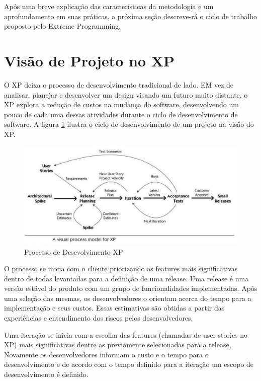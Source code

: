 Após uma breve explicação das características da metodologia e um aprofundamento em suas práticas, a próxima seção descreve-rá o ciclo de trabalho proposto pelo Extreme Programming.

\section{Visão de Projeto no XP}

O XP deixa o processo de desenvolvimento tradicional de lado. EM vez de analisar, planejar e desenvolver um design visando um futuro muito distante, o XP explora a redução de custos na mudança do software, desenvolvendo um pouco de cada uma dessas atividades durante o ciclo de desenvolvimento de software. \cite{Beck:1999} A figura \ref{fig03} ilustra o ciclo de desenvolvimento de um projeto na visão do XP.

\begin{figure}[h]
	\centering
		\includegraphics[keepaspectratio=true,scale=0.9]{figuras/fig03.eps}
	\caption{Processo de Desevolvimento XP \cite{Process}}
	\label{fig03}
\end{figure}

O processo se inicia com o cliente priorizando as features mais significativas dentro de todas levantadas para a definição de uma release. Uma release é uma versão estável do produto com um grupo de funcionalidades implementadas. Após uma seleção das mesmas, os desenvolvedores o orientam acerca do tempo para a implementação e seus custos. \cite{Beck:1999} Essas estimativas são obtidas a partir das experiências e entendimento dos riscos pelos desenvolvedores. \cite{Bernabe:2015}

Uma iteração se inicia com a escolha das features (chamadas de user stories no XP) mais significativas dentre as previamente selecionadas para a release, Novamente os desenvolvedores informam o custo e o tempo para o desenvolvimento e de acordo com o tempo definido para a iteração um escopo de desenvolvimento é definido. \cite{Beck:1999}

